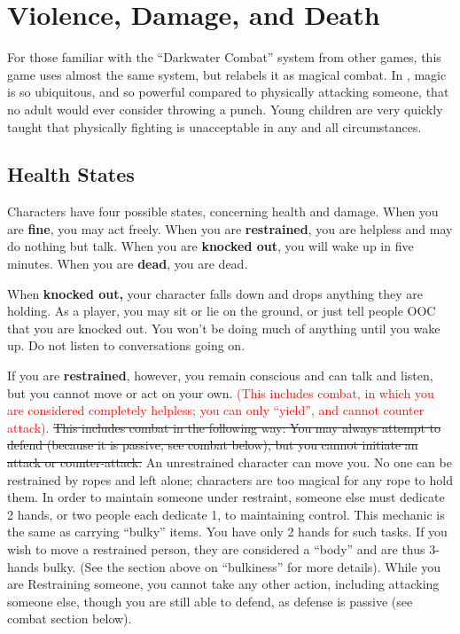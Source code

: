 \documentclass[sheet]{GL2020}
\begin{document}
\section{Violence, Damage, and Death}
For those familiar with the ``Darkwater Combat'' system from other games, this game uses almost the same system, but relabels it as magical combat. In \pEarth{}, magic is so ubiquitous, and so powerful compared to physically attacking someone, that no adult would ever consider throwing a punch. Young children are very quickly taught that physically fighting is unacceptable in any and all circumstances.

\subsection{Health States}

Characters have four possible states, concerning health and damage. When you are {\bf fine}, you may act freely. When you are {\bf restrained}, you are helpless and may do nothing but talk. When you are {\bf knocked out}, you will wake up in five minutes. When you are {\bf dead}, you are dead.

When \textbf{knocked out,} your character falls down and drops anything they are holding. As a player, you may sit or lie on the ground, or just tell people OOC that you are knocked out. You won't be doing much of anything until you wake up. Do not listen to conversations going on. 

If you are \textbf{restrained}, however, you remain conscious and can talk and listen, but you cannot move or act on your own. \textcolor{red}{(This includes combat, in which you are considered completely helpless; you can only ``yield'', and cannot counter attack).} \sout{This includes combat in the following way: You may always attempt to defend (because it is passive, see combat below), but you cannot initiate an attack or counter-attack.} An unrestrained character can move you. No one can be restrained by ropes and left alone; characters are too magical for any rope to hold them. In order to maintain someone under restraint, someone else must dedicate 2 hands, or two people each dedicate 1, to maintaining control. This mechanic is the same as carrying ``bulky'' items. You have only 2 hands for such tasks. If you wish to move a restrained person, they are considered a ``body'' and are thus 3-hands bulky. (See the section above on ``bulkiness'' for more details). While you are Restraining someone, you cannot take any other action, including attacking someone else, though you are still able to defend, as defense is passive (see combat section below).
\end{document}
